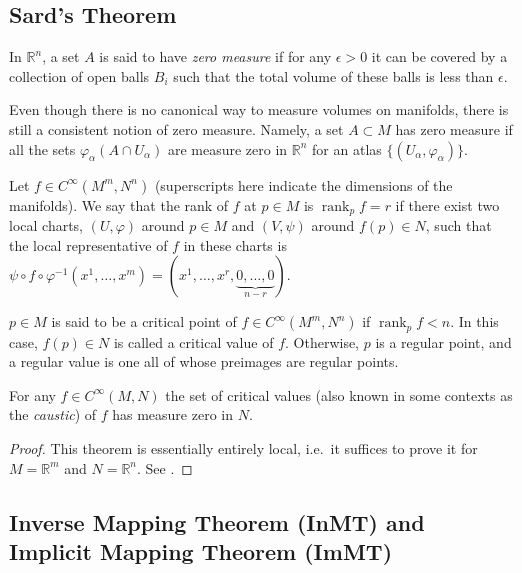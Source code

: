 \documentclass[english,letterpaper]{article}%
\numberwithin{equation}{section}
\numberwithin{figure}{section}
\numberwithin{table}{section}
\theoremstyle{definition}
\theoremstyle{definition}
\theoremstyle{definition}
\theoremstyle{plain}
\theoremstyle{plain}
\theoremstyle{plain}
\theoremstyle{plain}
\theoremstyle{remark}
\theoremstyle{remark}
\DeclareMathOperator{\rank}{rank}
\begin{document}
\subsection{Sard's Theorem}

In $\mathbb{R}^n$, a set $A$ is said to have\emph{ zero measure} if for any $\epsilon>0$ it can be covered by a collection of open balls $B_i$ such that the total volume of these balls is less than $\epsilon$.

\begin{defn}
Even though there is no canonical way to measure volumes on manifolds, there is still a consistent notion of zero measure. Namely, a set $A\subset M$ has zero measure if all the sets $\varphi_\alpha(A\cap U_\alpha)$ are measure zero in $\mathbb{R}^n$ for an atlas $\{(U_\alpha,\varphi_\alpha)\}$.
\end{defn}

\begin{defn}\label{def.rank}
Let $f\in C^\infty (M^m,N^n)$ (superscripts here indicate the dimensions of the manifolds). We say that the rank of $f$ at $p\in M$ is $\rank_p f=r$ if there exist two local charts, $(U,\varphi)$ around $p \in M$ and $(V,\psi)$ around $f(p)\in N$, such that the local representative of $f$ in these charts is $\psi\circ f\circ\varphi^{-1}(x^1,\ldots,x^m)=(x^1,\ldots,x^r,\underbrace{0,\ldots,0}_{n-r})$.
\end{defn}

\begin{defn}
$p\in M$ is said to be a critical point of $f\in C^\infty(M^m,N^n)$ if $\rank_p f<n$. In this case, $f(p)\in N$ is called a critical value of $f$. Otherwise, $p$ is a regular point, and a regular value is one all of whose preimages are regular points.
\end{defn}
\begin{thm}[Sard]
For any $f\in C^\infty(M,N)$ the set of critical values (also known in some contexts as the \emph{caustic}) of $f$ has measure zero in $N$.
\end{thm}
\begin{proof}
This theorem is essentially entirely local, i.e.\ it suffices to prove it for $M=\mathbb{R}^m$ and $N=\mathbb{R}^n$. See \cite[Thm 6.10]{Lee}.
\end{proof}

\subsection{Inverse Mapping Theorem (InMT) and Implicit Mapping Theorem (ImMT)}
\end{document}
